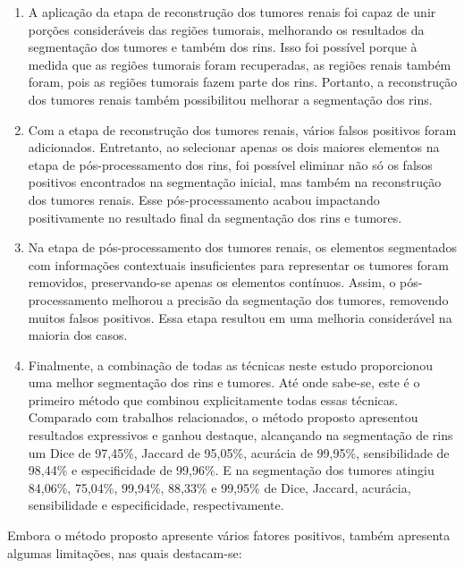 \begin{enumerate}
    \item A aplicação da etapa de reconstrução dos tumores renais foi capaz de unir porções consideráveis das regiões tumorais, melhorando os resultados da segmentação dos tumores e também dos rins. Isso foi possível porque à medida que as regiões tumorais foram recuperadas, as regiões renais também foram, pois as regiões tumorais fazem parte dos rins. Portanto, a reconstrução dos tumores renais também possibilitou melhorar a segmentação dos rins.
    
    \item Com a etapa de reconstrução dos tumores renais, vários falsos positivos foram adicionados. Entretanto, ao selecionar apenas os dois maiores elementos na etapa de pós-processamento dos rins, foi possível eliminar não só os falsos positivos encontrados na segmentação inicial, mas também na reconstrução dos tumores renais. Esse pós-processamento acabou impactando positivamente no resultado final da segmentação dos rins e tumores.
    
    \item Na etapa de pós-processamento dos tumores renais, os elementos segmentados com informações contextuais insuficientes para representar os tumores foram removidos, preservando-se apenas os elementos contínuos. Assim, o pós-processamento melhorou a precisão da segmentação dos tumores, removendo muitos falsos positivos. Essa etapa resultou em uma melhoria considerável na maioria dos casos.
    
    \item Finalmente, a combinação de todas as técnicas neste estudo proporcionou uma melhor segmentação dos rins e tumores. Até onde sabe-se, este é o primeiro método que combinou explicitamente todas essas técnicas. Comparado com trabalhos relacionados, o método proposto apresentou resultados expressivos e ganhou destaque, alcançando na segmentação de rins um Dice de 97,45\%, Jaccard de 95,05\%, acurácia de 99,95\%, sensibilidade de 98,44\% e especificidade de 99,96\%. E na segmentação dos tumores atingiu 84,06\%, 75,04\%, 99,94\%, 88,33\% e 99,95\% de Dice, Jaccard, acurácia, sensibilidade e especificidade, respectivamente.
\end{enumerate}

Embora o método proposto apresente vários fatores positivos, também apresenta algumas limitações, nas quais destacam-se:

